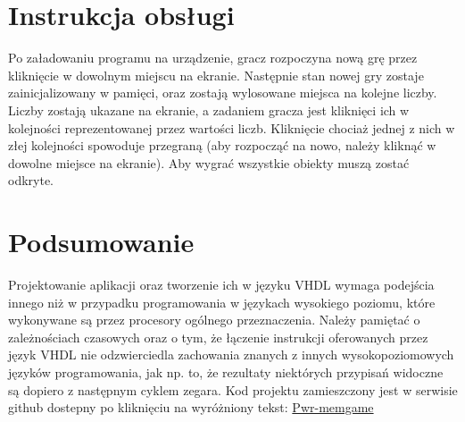 \documentclass[polish,polish,a4paper]{article}
\begin{document}
\section{Instrukcja obsługi}
Po załadowaniu programu na urządzenie, gracz rozpoczyna nową grę przez kliknięcie w dowolnym miejscu na ekranie.
Następnie stan nowej gry zostaje zainicjalizowany w pamięci, oraz zostają wylosowane miejsca na kolejne liczby.
Liczby zostają ukazane na ekranie, a zadaniem gracza jest kliknięci ich w kolejności reprezentowanej przez wartości liczb.
Kliknięcie chociaż jednej z nich w złej kolejności spowoduje przegraną (aby rozpocząć na nowo, należy kliknąć w dowolne miejsce na ekranie).
Aby wygrać wszystkie obiekty muszą zostać odkryte.

\section{Podsumowanie}
Projektowanie aplikacji oraz tworzenie ich w języku VHDL wymaga podejścia innego niż w przypadku programowania w językach wysokiego poziomu, które
wykonywane są przez procesory ogólnego przeznaczenia.
Należy pamiętać o zależnościach czasowych oraz o tym, że łączenie instrukcji oferowanych przez język VHDL nie odzwierciedla zachowania znanych z innych wysokopoziomowych języków programowania, jak np. to, że rezultaty niektórych przypisań widoczne są dopiero z następnym cyklem zegara.
\newline
Kod projektu zamieszczony jest w serwisie github dostepny po kliknięciu na wyróżniony tekst:
\textcolor{blue}{\href{https://github.com/3919/pwr-memgame}{Pwr-memgame}}
\end{document}
